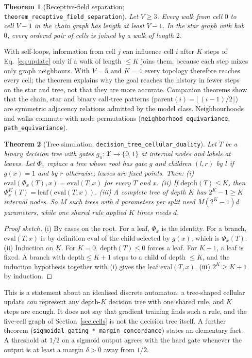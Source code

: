 \documentclass[10pt]{article}
\newtheorem{theorem}{Theorem}
\begin{document}
\begin{theorem}[Receptive-field separation; \texttt{theorem\_\allowbreak{}receptive\_\allowbreak{}field\_\allowbreak{}separation}]\label{thm:diameter}
Let $V\ge3$. Every walk from cell $0$ to cell $V{-}1$ in the chain graph has length at least $V{-}1$. In the star graph with hub $0$, every ordered pair of cells is joined by a walk of length $2$.
\end{theorem}
With self-loops, information from cell $j$ can influence cell $i$ after $K$ steps of Eq.~\eqref{eq:update} only if a walk of length $\le K$ joins them, because each step mixes only graph neighbours. With $V{=}5$ and $K{=}4$ every topology therefore reaches every cell; the theorem explains why the goal reaches the history in fewer steps on the star and tree, not that they are more accurate. Companion theorems show that the chain, star and binary call-tree patterns ($\mathrm{parent}(i) = \lfloor (i-1)/2\rfloor$) are symmetric adjacency relations admitted by the model class. Neighbourhoods and walks commute with node permutations (\texttt{neighborhood\_\allowbreak{}equivariance}, \texttt{path\_\allowbreak{}equivariance}).

\begin{theorem}[Tree simulation; \texttt{decision\_\allowbreak{}tree\_\allowbreak{}cellular\_\allowbreak{}duality}]\label{thm:tree-nca-duality}
Let $T$ be a binary decision tree with gates $g_u:\mathcal{X}\to\{0,1\}$ at internal nodes and labels at leaves. Let $\Phi_x$ replace a tree whose root has gate $g$ and children $(l,r)$ by $l$ if $g(x)=1$ and by $r$ otherwise; leaves are fixed points. Then:
(i) $\mathrm{eval}(\Phi_x(T),x) = \mathrm{eval}(T,x)$ for every $T$ and $x$.
(ii) If $\mathrm{depth}(T)\le K$, then $\Phi_x^{K}(T) = \mathrm{leaf}(\mathrm{eval}(T,x))$.
(iii) A complete tree of depth $K$ has $2^K-1\ge K$ internal nodes. So $M$ such trees with $d$ parameters per split need $M(2^K-1)d$ parameters, while one shared rule applied $K$ times needs $d$.
\end{theorem}
\begin{proof}[Proof sketch]
(i) By cases on the root. For a leaf, $\Phi_x$ is the identity. For a branch, $\mathrm{eval}(T,x)$ is by definition $\mathrm{eval}$ of the child selected by $g(x)$, which is $\Phi_x(T)$. (ii) Induction on $K$. For $K{=}0$, $\mathrm{depth}(T)\le0$ forces a leaf. For $K{+}1$, a leaf is fixed. A branch with $\mathrm{depth}\le K{+}1$ steps to a child of depth $\le K$, and the induction hypothesis together with (i) gives the leaf $\mathrm{eval}(T,x)$. (iii) $2^K \ge K+1$ by induction.
\end{proof}
This is a statement about an idealised discrete automaton: a tree-shaped cellular update \emph{can} represent any depth-$K$ decision tree with one shared rule, and $K$ steps are enough. It does not say that gradient training finds such a rule, and the five-cell graph of Section~\ref{sec:cells} is not the decision tree itself. A further theorem (\texttt{sigmoidal\_\allowbreak{}gating\_\allowbreak{}*\_\allowbreak{}margin\_\allowbreak{}concordance}) states an elementary fact. A threshold at $1/2$ on a sigmoid output agrees with the hard gate whenever the output is at least a margin $\delta>0$ away from $1/2$.
\end{document}
